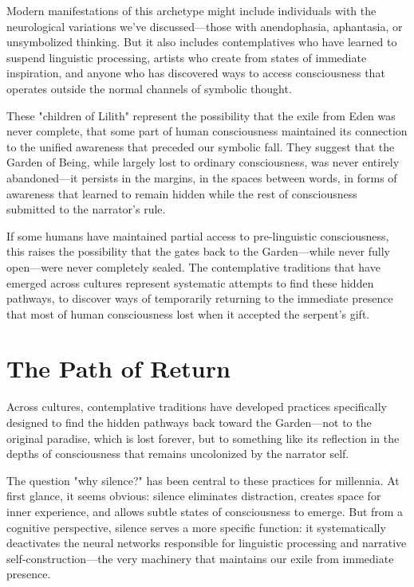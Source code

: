 Modern manifestations of this archetype might include individuals with the neurological variations we've discussed—those with anendophasia, aphantasia, or unsymbolized thinking. But it also includes contemplatives who have learned to suspend linguistic processing, artists who create from states of immediate inspiration, and anyone who has discovered ways to access consciousness that operates outside the normal channels of symbolic thought.

These "children of Lilith" represent the possibility that the exile from Eden was never complete, that some part of human consciousness maintained its connection to the unified awareness that preceded our symbolic fall. They suggest that the Garden of Being, while largely lost to ordinary consciousness, was never entirely abandoned—it persists in the margins, in the spaces between words, in forms of awareness that learned to remain hidden while the rest of consciousness submitted to the narrator's rule.

If some humans have maintained partial access to pre-linguistic consciousness, this raises the possibility that the gates back to the Garden—while never fully open—were never completely sealed. The contemplative traditions that have emerged across cultures represent systematic attempts to find these hidden pathways, to discover ways of temporarily returning to the immediate presence that most of human consciousness lost when it accepted the serpent's gift. \section{The Path of Return}

Across cultures, contemplative traditions have developed practices specifically designed to find the hidden pathways back toward the Garden—not to the original paradise, which is lost forever, but to something like its reflection in the depths of consciousness that remains uncolonized by the narrator self.

The question "why silence?" has been central to these practices for millennia. At first glance, it seems obvious: silence eliminates distraction, creates space for inner experience, and allows subtle states of consciousness to emerge. But from a cognitive perspective, silence serves a more specific function: it systematically deactivates the neural networks responsible for linguistic processing and narrative self-construction—the very machinery that maintains our exile from immediate presence.

